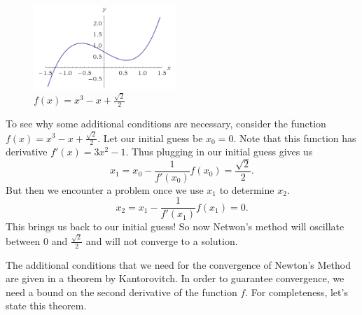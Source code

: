 \documentclass[twoside,letterpaper,10pt]{article}
\numberwithin{equation}{section}
\begin{document}
\begin{figure}
  \begin{center}
    \includegraphics[width=0.48\textwidth]{newtonfail}
  \end{center}
  \caption{$f(x) = x^3 - x + \frac{\sqrt{2}}{2}$}
\end{figure}
To see why some additional conditions are necessary, consider the function $f(x)
= x^3 - x + \frac{\sqrt{2}}{2}$.
Let our initial guess be $x_0 = 0$.
Note that this function has derivative $f'(x) = 3x^2 - 1$.
Thus plugging in our initial guess gives us
\begin{equation*}
  x_1 = x_0 - \frac{1}{f'(x_0)} f(x_0) = \frac{\sqrt{2}}{2}.
\end{equation*}
But then we encounter a problem once we use $x_1$ to determine $x_2$.
\begin{equation*}
  x_2 = x_1 - \frac{1}{f'(x_1)} f(x_1) = 0.
\end{equation*}
This brings us back to our initial guess!
So now Netwon's method will oscillate between $0$ and $\frac{\sqrt{2}}{2}$ and
will not converge to a solution.

The additional conditions that we need for the convergence of Newton's Method
are given in a theorem by Kantorovitch.
In order to guarantee convergence, we need a bound on the second derivative of
the function $f$.
For completeness, let's state this theorem.
\end{document}
